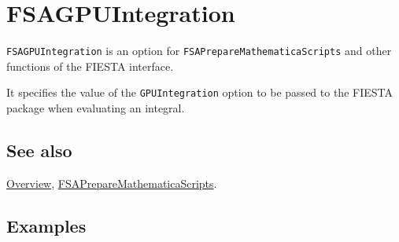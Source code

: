 \documentclass[../FeynHelpersManual.tex]{subfiles}
\begin{document}
\begin{Shaded}
\begin{Highlighting}[]
 
\end{Highlighting}
\end{Shaded}

\hypertarget{fsagpuintegration}{
\section{FSAGPUIntegration}\label{fsagpuintegration}}

\texttt{FSAGPUIntegration} is an option for
\texttt{FSAPrepareMathematicaScripts} and other functions of the FIESTA
interface.

It specifies the value of the \texttt{GPUIntegration} option to be
passed to the FIESTA package when evaluating an integral.

\subsection{See also}

\hyperlink{toc}{Overview},
\hyperlink{fsapreparemathematicascripts}{FSAPrepareMathematicaScripts}.

\subsection{Examples}
\end{document}
